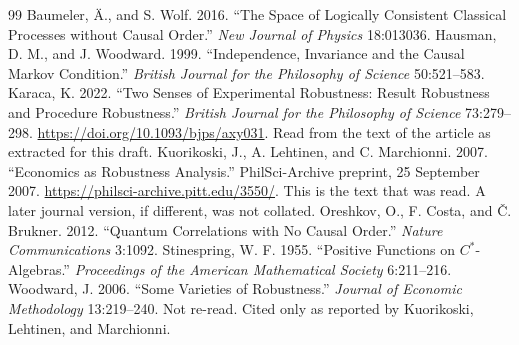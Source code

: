 \documentclass[12pt]{article}
\begin{document}
\begin{thebibliography}{99}
 Baumeler, \"A., and S. Wolf. 2016. ``The Space of Logically Consistent Classical Processes without Causal Order.'' \textit{New Journal of Physics} 18:013036.
 Hausman, D. M., and J. Woodward. 1999. ``Independence, Invariance and the Causal Markov Condition.'' \textit{British Journal for the Philosophy of Science} 50:521--583.
 Karaca, K. 2022. ``Two Senses of Experimental Robustness: Result Robustness and Procedure Robustness.'' \textit{British Journal for the Philosophy of Science} 73:279--298. \url{https://doi.org/10.1093/bjps/axy031}. Read from the text of the article as extracted for this draft.
 Kuorikoski, J., A. Lehtinen, and C. Marchionni. 2007. ``Economics as Robustness Analysis.'' PhilSci-Archive preprint, 25 September 2007. \url{https://philsci-archive.pitt.edu/3550/}. This is the text that was read. A later journal version, if different, was not collated.
 Oreshkov, O., F. Costa, and \v{C}. Brukner. 2012. ``Quantum Correlations with No Causal Order.'' \textit{Nature Communications} 3:1092.
 Stinespring, W. F. 1955. ``Positive Functions on \(C^{*}\)-Algebras.'' \textit{Proceedings of the American Mathematical Society} 6:211--216.
 Woodward, J. 2006. ``Some Varieties of Robustness.'' \textit{Journal of Economic Methodology} 13:219--240. Not re-read. Cited only as reported by Kuorikoski, Lehtinen, and Marchionni.
\end{thebibliography}
\end{document}
